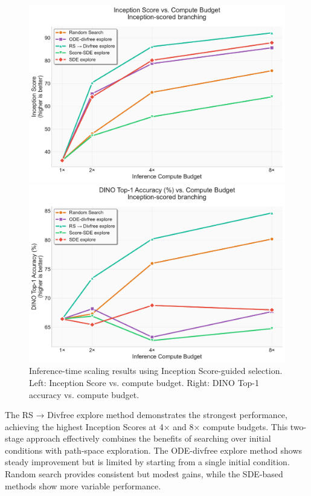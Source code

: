 \documentclass{article}
\begin{document}
\begin{figure}[H]
  \centering
  \begin{minipage}{0.48\textwidth}
    \centering
    \includegraphics[width=\textwidth]{figures/scaling_inception_is.pdf}
  \end{minipage}
  \hfill
  \begin{minipage}{0.48\textwidth}
    \centering
    \includegraphics[width=\textwidth]{figures/scaling_inception_top1.pdf}
  \end{minipage}
  \caption{Inference-time scaling results using Inception Score-guided selection. Left: Inception Score vs. compute budget. Right: DINO Top-1 accuracy vs. compute budget.}
  \label{fig:inception-scaling}
\end{figure}

The RS → Divfree explore method demonstrates the strongest performance, achieving the highest Inception Scores at 4× and 8× compute budgets. This two-stage approach effectively combines the benefits of searching over initial conditions with path-space exploration. The ODE-divfree explore method shows steady improvement but is limited by starting from a single initial condition. Random search provides consistent but modest gains, while the SDE-based methods show more variable performance.
\end{document}
